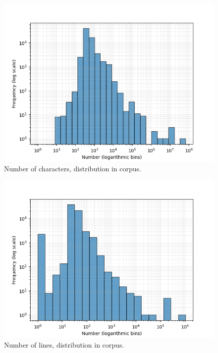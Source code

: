 \documentclass[conference]{IEEEtran}
\begin{document}
\begin{figure}[htbp]
\centerline{\includegraphics[width=\linewidth]{"./Number of characters, distribution in corpus.png"}}
\caption{Number of characters, distribution in corpus.}
\label{fig}
\end{figure}

\begin{figure}[htbp]
    \centerline{\includegraphics[width=\linewidth]{"./Number of lines, distribution in corpus.png"}}
    \caption{Number of lines, distribution in corpus.}
    \label{fig}
    \end{figure}
\end{document}
